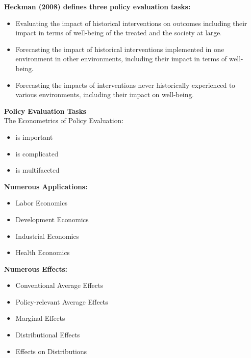 \begin{frame}
	\textbf{Heckman (2008) defines three policy evaluation tasks:}
	\begin{itemize}\setlength\itemsep{1em}
		\item Evaluating the impact of historical interventions on outcomes including their impact in terms of well-being of the treated and the society at large.
		\item Forecasting the impact of historical interventions implemented in one environment in other environments, including their impact in terms of well-being.
		\item Forecasting the impacts of interventions never historically experienced to various environments, including their impact on well-being.
	\end{itemize}
\end{frame}
\begin{frame}
	\textbf{Policy Evaluation Tasks} \\ \vspace{15pt}
	The Econometrics of Policy Evaluation:
	\begin{itemize}\setlength\itemsep{1em}
		\item is important
		\item is complicated
		\item is multifaceted
	\end{itemize}
\end{frame}  
\begin{frame}
	\textbf{Numerous Applications:}
	\begin{itemize}\setlength\itemsep{1em}
		\item Labor Economics
		\item Development Economics
		\item Industrial Economics
		\item Health Economics
	\end{itemize} 
\end{frame}  
\begin{frame}
	\textbf{Numerous Effects:}
	\begin{itemize}\setlength\itemsep{1em}
		\item Conventional Average Effects
		\item Policy-relevant Average Effects
		\item Marginal Effects
		\item Distributional Effects
		\item Effects on Distributions
	\end{itemize}
\end{frame}
